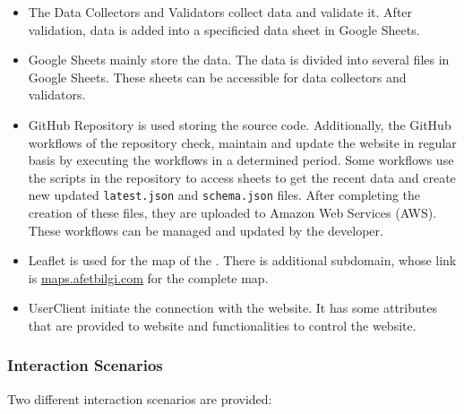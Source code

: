 \begin{itemize}
  \item The Data Collectors and Validators collect data and validate it. After validation, data is added into a specificied data sheet in Google Sheets.
  \item Google Sheets mainly store the data. The data is divided into several files in Google Sheets. These sheets can be accessible for data collectors and validators.
  \item GitHub Repository is used storing the source code. Additionally, the GitHub workflows of the repository check, maintain and update the website in regular basis by executing the workflows in a determined period.
  \subitem Some workflows use the scripts in the repository to access sheets to get the recent data and create new updated \texttt{latest.json} and \texttt{schema.json} files. After completing the creation of these files, they are uploaded to Amazon Web Services (AWS). These workflows can be managed and updated by the developer.
  \item Leaflet is used for the map of the \afetbilgi. There is additional subdomain, whose link is \href{https://maps.afetbilgi.com}{maps.afetbilgi.com} for the complete map.
  \item UserClient initiate the connection with the website. It has some attributes that are provided to website and functionalities to control the website.
\end{itemize}

\vspace*{\fill}
\newpage

\subsubsection{Interaction Scenarios}

Two different interaction scenarios are provided:

